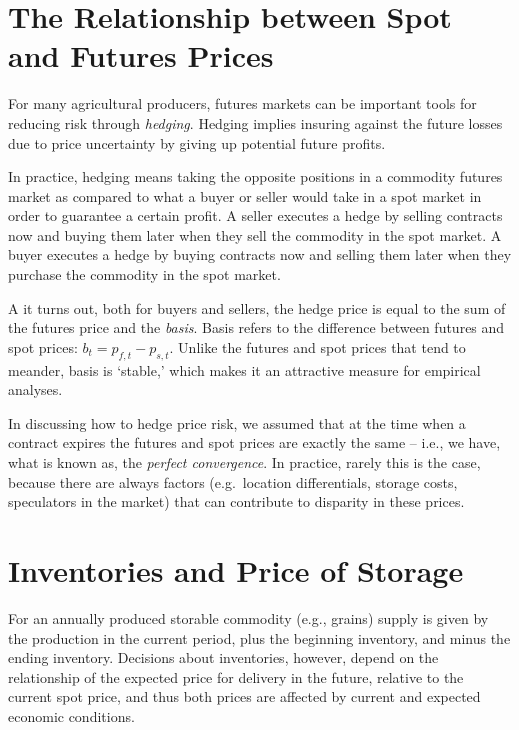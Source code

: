 \documentclass[
]{book}
\begin{document}
\hypertarget{the-relationship-between-spot-and-futures-prices}{%
\section{The Relationship between Spot and Futures Prices}\label{the-relationship-between-spot-and-futures-prices}}

For many agricultural producers, futures markets can be important tools for reducing risk through \emph{hedging}. Hedging implies insuring against the future losses due to price uncertainty by giving up potential future profits.

In practice, hedging means taking the opposite positions in a commodity futures market as compared to what a buyer or seller would take in a spot market in order to guarantee a certain profit. A seller executes a hedge by selling contracts now and buying them later when they sell the commodity in the spot market. A buyer executes a hedge by buying contracts now and selling them later when they purchase the commodity in the spot market.

A it turns out, both for buyers and sellers, the hedge price is equal to the sum of the futures price and the \emph{basis}. Basis refers to the difference between futures and spot prices: \(b_{t} = p_{f,t}-p_{s,t}\). Unlike the futures and spot prices that tend to meander, basis is `stable,' which makes it an attractive measure for empirical analyses.

In discussing how to hedge price risk, we assumed that at the time when a contract expires the futures and spot prices are exactly the same -- i.e., we have, what is known as, the \emph{perfect convergence}. In practice, rarely this is the case, because there are always factors (e.g.~location differentials, storage costs, speculators in the market) that can contribute to disparity in these prices.

\hypertarget{inventories-and-price-of-storage}{%
\section{Inventories and Price of Storage}\label{inventories-and-price-of-storage}}

For an annually produced storable commodity (e.g., grains) supply is given by the production in the current period, plus the beginning inventory, and minus the ending inventory. Decisions about inventories, however, depend on the relationship of the expected price for delivery in the future, relative to the current spot price, and thus both prices are affected by current and expected economic conditions.
\end{document}
